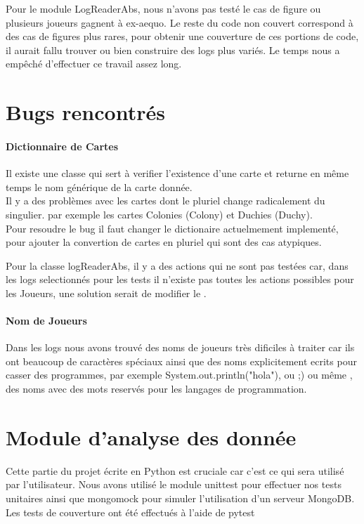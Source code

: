 Pour le module LogReaderAbs, nous n'avons pas testé le cas de figure ou plusieurs joueurs gagnent à ex-aequo. Le reste du code non couvert correspond à des cas de figures plus rares, pour obtenir une couverture de ces portions de code, il aurait fallu trouver ou bien construire des logs plus variés. Le temps nous a empêché d'effectuer ce travail assez long.

\section{Bugs rencontrés}

\paragraph*{Dictionnaire de Cartes} 

Il existe une classe qui sert à verifier l'existence d'une carte et returne en même temps le nom générique de la carte donnée.\\
Il y a des problèmes avec les cartes dont le pluriel change radicalement du singulier. par exemple les cartes Colonies (Colony) et Duchies (Duchy). \\

Pour resoudre le bug il faut changer le dictionaire actuelmement implementé, pour ajouter la convertion de cartes en pluriel qui sont des cas atypiques.

Pour la classe logReaderAbs, il y a des actions qui ne sont pas testées car, dans les logs selectionnés pour les tests il n'existe pas toutes les actions possibles pour les Joueurs, une solution serait de modifier le .

\paragraph*{Nom de Joueurs} 

Dans les logs nous avons trouvé des noms de joueurs très dificiles à traiter car ils ont beaucoup de caractères spéciaux ainsi que des noms explicitement ecrits pour casser des programmes,
par exemple System.out.println("hola"), ou ;) ou même , des noms avec des mots reservés pour les langages de programmation.


\section{Module d'analyse des donnée}
Cette partie du projet écrite en Python est cruciale car c'est ce qui sera utilisé par l'utilisateur. Nous avons utilisé le module unittest pour effectuer nos tests unitaires ainsi que mongomock pour simuler l'utilisation d'un serveur MongoDB. Les tests de couverture ont été effectués à l'aide de pytest


